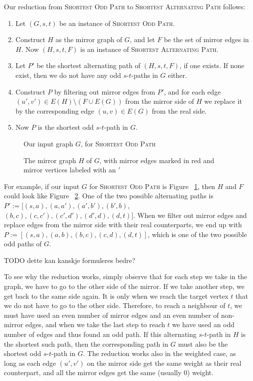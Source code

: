 Our reduction from \textsc{Shortest Odd Path} to \textsc{Shortest Alternating Path} follows:
\begin{enumerate}
    \item Let $(G, s, t)$ be an instance of \textsc{Shortest Odd Path}.
    \item Construct $H$ as the mirror graph of $G$, and let $F$ be the set of mirror edges in $H$. Now $(H, s, t, F)$ is an instance of \textsc{Shortest Alternating Path}.
    \item Let $P'$ be the shortest alternating path of $(H, s, t, F)$, if one exists. If none exist, then we do not have any odd $s$-$t$-paths in $G$ either.
    \item Construct $P$ by filtering out mirror edges from $P'$, and for each edge $(u',v') \in E(H) \setminus (F \cup E(G))$ from the mirror side of $H$ we replace it by the corresponding edge $(u,v) \in E(G)$ from the real side.
    \item Now $P$ is the shortest odd $s$-$t$-path in $G$.
\end{enumerate}

\begin{figure}
    \centering
    
    \caption{Our input graph $G$, for \textsc{Shortest Odd Path}}
    \label{small5}
\end{figure}

\begin{figure}
    \centering
    
    \caption{The mirror graph $H$ of $G$, with mirror edges marked in red and mirror vertices labeled with an $'$}
    \label{small5-2}
\end{figure}

For example, if our input $G$ for \textsc{Shortest Odd Path} is Figure ~\ref{small5}, then $H$ and $F$ could look like Figure ~\ref{small5-2}. One of the two possible alternating paths is $P' := [(s,a), (a, a'), (a',b'), (b',b)$, $(b,c), (c,c'), (c',d'), (d',d), (d,t)]$. When we filter out mirror edges and replace edges from the mirror side with their real counterparts, we end up with $P := [(s,a),(a,b),(b,c),(c,d),(d,t)]$, which is one of the two possible odd paths of $G$. 

TODO dette kan kanskje formuleres bedre?

To see why the reduction works, simply observe that for each step we take in the graph, we have to go to the other side of the mirror. If we take another step, we get back to the same side again. It is only when we reach the target vertex $t$ that we do not have to go to the other side. Therefore, to reach a neighbour of $t$, we must have used an even number of mirror edges and an even number of non-mirror edges, and when we take the last step to reach $t$ we have used an odd number of edges and thus found an odd path. If this alternating $s$-$t$-path in $H$ is the shortest such path, then the corresponding path in $G$ must also be the shortest odd $s$-$t$-path in $G$. The reduction works also in the weighted case, as long as each edge $(u',v')$ on the mirror side get the same weight as their real counterpart, and all the mirror edges get the same (usually 0) weight.

